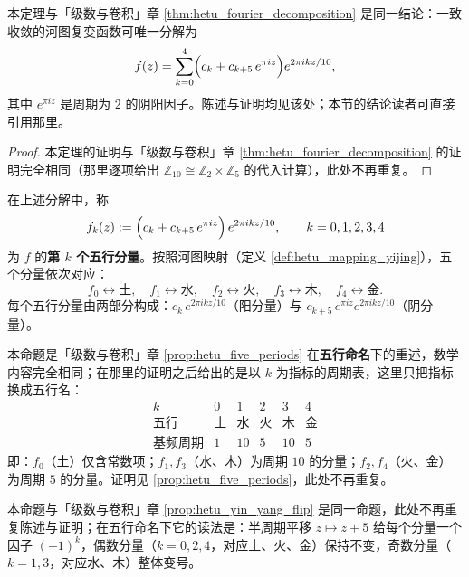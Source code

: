 \begin{remark}[河图傅里叶分解（重述）]\label{thm:hetu_fourier_decomposition_yijing}
本定理与「级数与卷积」章 \cref{thm:hetu_fourier_decomposition} 是同一结论：一致收敛的河图复变函数可唯一分解为
\[
f(z) = \sum_{k=0}^{4} \Bigl( c_k + c_{k+5}\, e^{\pi i z} \Bigr) e^{2\pi i k z / 10},
\]
其中 $e^{\pi i z}$ 是周期为 $2$ 的阴阳因子。陈述与证明均见该处；本节的结论读者可直接引用那里。
\end{remark}

\begin{proof}
本定理的证明与「级数与卷积」章 \cref{thm:hetu_fourier_decomposition} 的证明完全相同（那里逐项给出 $\mathbb{Z}_{10} \cong \mathbb{Z}_2 \times \mathbb{Z}_5$ 的代入计算），此处不再重复。
\end{proof}

\begin{definition}[五行分量]\label{def:hetu_five_components_yijing}
在上述分解中，称
\[
f_k(z) := \Bigl( c_k + c_{k+5}\, e^{\pi i z} \Bigr)\, e^{2\pi i k z / 10}, \qquad k = 0, 1, 2, 3, 4
\]
为 $f$ 的\textbf{第 $k$ 个五行分量}。按照河图映射（定义 \ref{def:hetu_mapping_yijing}），五个分量依次对应：
\[
f_0 \leftrightarrow \text{土},\quad f_1 \leftrightarrow \text{水},\quad f_2 \leftrightarrow \text{火},\quad f_3 \leftrightarrow \text{木},\quad f_4 \leftrightarrow \text{金}.
\]
每个五行分量由两部分构成：$c_k\, e^{2\pi i k z / 10}$（阳分量）与 $c_{k+5}\, e^{\pi i z} e^{2\pi i k z / 10}$（阴分量）。
\end{definition}

\begin{remark}\label{prop:hetu_five_periods_yijing}
本命题是「级数与卷积」章 \cref{prop:hetu_five_periods} 在\textbf{五行命名}下的重述，数学内容完全相同；在那里的证明之后给出的是以 $k$ 为指标的周期表，这里只把指标换成五行名：
\[
\begin{array}{c|ccccc}
k & 0 & 1 & 2 & 3 & 4 \\
\hline
\text{五行} & \text{土} & \text{水} & \text{火} & \text{木} & \text{金} \\
\text{基频周期} & 1 & 10 & 5 & 10 & 5
\end{array}
\]
即：$f_0$（土）仅含常数项；$f_1, f_3$（水、木）为周期 $10$ 的分量；$f_2, f_4$（火、金）为周期 $5$ 的分量。证明见 \cref{prop:hetu_five_periods}，此处不再重复。
\end{remark}

\begin{remark}\label{prop:hetu_yin_yang_flip_yijing}
本命题与「级数与卷积」章 \cref{prop:hetu_yin_yang_flip} 是同一命题，此处不再重复陈述与证明；在五行命名下它的读法是：半周期平移 $z \mapsto z + 5$ 给每个分量一个因子 $(-1)^k$，偶数分量（$k = 0, 2, 4$，对应土、火、金）保持不变，奇数分量（$k = 1, 3$，对应水、木）整体变号。
\end{remark}

